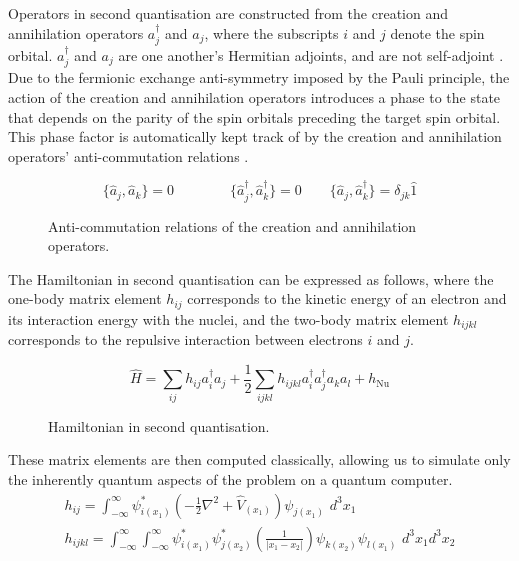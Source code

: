 Operators in second quantisation are constructed from the creation and annihilation operators $a_j^\dagger$ and $a_j$, where the subscripts $i$ and $j$ denote the spin orbital. $a_j^\dagger$ and $a_j$ are one another's Hermitian adjoints, and are not self-adjoint \cite{Helgaker2000}. Due to the fermionic exchange anti-symmetry imposed by the Pauli principle, the action of the creation and annihilation operators introduces a phase to the state that depends on the parity of the spin orbitals preceding the target spin orbital. This phase factor is automatically kept track of by the creation and annihilation operators' anti-commutation relations \cite{Helgaker2000}.

\begin{figure}[H]
    \centering
    \begin{equation*}
        \{ \hat a_{j}, \hat a_{k} \} = 0 \qquad \qquad
        \{ \hat a_{j}^{\dagger}, \hat a_{k}^{\dagger} \} = 0 \qquad
        \{ \hat a_{j}, \hat a_{k}^{\dagger} \} = \delta_{jk} \hat{1}
    \end{equation*}
    \caption{Anti-commutation relations of the creation and annihilation operators.}
    \label{anticommutation-relations}
\end{figure}

The Hamiltonian in second quantisation can be expressed as follows, where the one-body matrix element $h_{ij}$ corresponds to the kinetic energy of an electron and its interaction energy with the nuclei, and the two-body matrix element $h_{ijkl}$ corresponds to the repulsive interaction between electrons $i$ and $j$.

\begin{figure}[H]
    \centering
    \begin{equation*}
        \hat H =
        \sum_{ij} h_{ij} a^\dagger_i a_j +
        \frac{1}{2} \sum_{ijkl} h_{ijkl} a^\dagger_i a^\dagger_j a_k a_l +
        h_\text{Nu}
    \end{equation*}
    \caption{Hamiltonian in second quantisation.}
    \label{hamiltonian}
\end{figure}

These matrix elements are then computed classically, allowing us to simulate only the inherently quantum aspects of the problem on a quantum computer.
\begin{gather*}
h_{ij} = \int^\infty_{-\infty} \psi^*_{i(x_1)} \left( - \frac{1}{2} \nabla^2 + \hat V_{(x_1)} \right) \psi_{j(x_1)} \,\, d^3 x_1 \\[4ex]
%
h_{ijkl} = \int^\infty_{-\infty} \int^\infty_{-\infty} \psi^*_{i(x_1)} \psi^*_{j(x_2)} \left( \frac{1}{|x_1 - x_2|} \right) \psi_{k(x_2)} \psi_{l(x_1)} \,\, d^3 x_1 d^3 x_2
\end{gather*}
